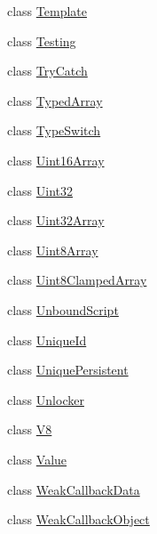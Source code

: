 \begin{DoxyCompactItemize}
class \hyperlink{classv8_1_1Template}{Template}
\item 
class \hyperlink{classv8_1_1Testing}{Testing}
\item 
class \hyperlink{classv8_1_1TryCatch}{Try\+Catch}
\item 
class \hyperlink{classv8_1_1TypedArray}{Typed\+Array}
\item 
class \hyperlink{classv8_1_1TypeSwitch}{Type\+Switch}
\item 
class \hyperlink{classv8_1_1Uint16Array}{Uint16\+Array}
\item 
class \hyperlink{classv8_1_1Uint32}{Uint32}
\item 
class \hyperlink{classv8_1_1Uint32Array}{Uint32\+Array}
\item 
class \hyperlink{classv8_1_1Uint8Array}{Uint8\+Array}
\item 
class \hyperlink{classv8_1_1Uint8ClampedArray}{Uint8\+Clamped\+Array}
\item 
class \hyperlink{classv8_1_1UnboundScript}{Unbound\+Script}
\item 
class \hyperlink{classv8_1_1UniqueId}{Unique\+Id}
\item 
class \hyperlink{classv8_1_1UniquePersistent}{Unique\+Persistent}
\item 
class \hyperlink{classv8_1_1Unlocker}{Unlocker}
\item 
class \hyperlink{classv8_1_1V8}{V8}
\item 
class \hyperlink{classv8_1_1Value}{Value}
\item 
class \hyperlink{classv8_1_1WeakCallbackData}{Weak\+Callback\+Data}
\item 
class \hyperlink{classv8_1_1WeakCallbackObject}{Weak\+Callback\+Object}
\end{DoxyCompactItemize}
